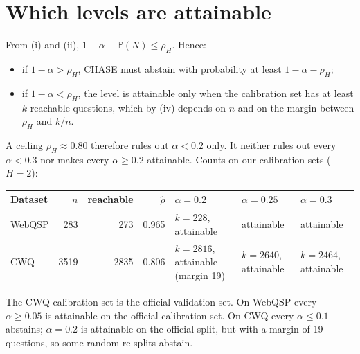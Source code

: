 \documentclass[11pt,a4paper]{article}
\theoremstyle{definition}
\theoremstyle{remark}
\newcommand{\Prob}{\mathbb{P}}
\newcommand{\method}{\textsc{CHASE}}
\begin{document}
\section{Which levels are attainable}

From (i) and (ii), $1-\alpha-\Prob(N)\le\rho_H$. Hence:
\begin{itemize}[nosep]
  \item if $1-\alpha>\rho_H$, \method{} must abstain with probability at least $1-\alpha-\rho_H$;
  \item if $1-\alpha<\rho_H$, the level is attainable only when the calibration set has at least $k$ reachable questions, which by (iv) depends on $n$ and on the margin between $\rho_H$ and $k/n$.
\end{itemize}
A ceiling $\rho_H\approx0.80$ therefore rules out $\alpha<0.2$ only. It neither rules out every $\alpha<0.3$ nor makes every $\alpha\ge0.2$ attainable. Counts on our calibration sets ($H=2$):

\begin{center}
\begin{tabular}{@{}lrrrlll@{}}
\toprule
Dataset & $n$ & reachable & $\hat\rho$ & $\alpha=0.2$ & $\alpha=0.25$ & $\alpha=0.3$\\
\midrule
WebQSP & 283  & 273  & 0.965 & $k=228$, attainable & attainable & attainable\\
CWQ    & 3519 & 2835 & 0.806 & $k=2816$, attainable (margin 19) & $k=2640$, attainable & $k=2464$, attainable\\
\bottomrule
\end{tabular}
\end{center}

\noindent The CWQ calibration set is the official validation set. On WebQSP every $\alpha\ge0.05$ is attainable on the official calibration set. On CWQ every $\alpha\le0.1$ abstains; $\alpha=0.2$ is attainable on the official split, but with a margin of 19 questions, so some random re-splits abstain.
\end{document}

